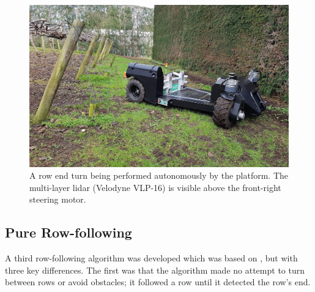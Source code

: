 \documentclass[preprint,authoryear,12pt]{elsarticle}
\begin{document}
    \begin{figure}[htb]
        \centering
        \includegraphics[width=\linewidth]{imgs/photos/suzy_turning.jpg}
        \caption{
            A row end turn being performed autonomously by the platform.
            The multi-layer lidar (Velodyne VLP-16) is visible above the front-right steering motor.
        }
        \label{fig:suzy_turning}
    \end{figure}

    \subsection{Pure Row-following}
    \label{sub:rowfollowing}
      A third row-following algorithm was developed which was based on \cite{Bell2016}, but with three key differences.
      The first was that the algorithm made no attempt to turn between rows or avoid obstacles; it followed a row until it detected the row's end.
\end{document}
